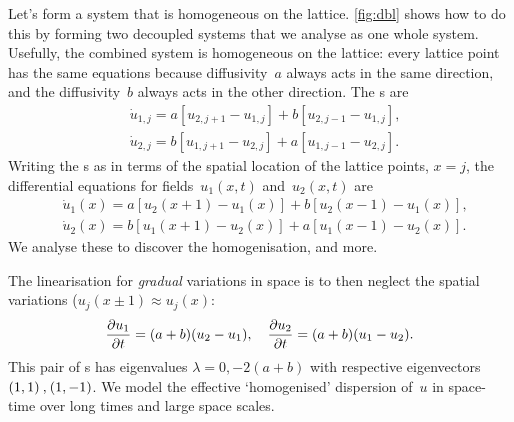 Let's form a system that is homogeneous on the lattice.
\cref{fig:dbl} shows how to do this by forming two decoupled
systems that we analyse as one whole system. Usefully, the
combined system is homogeneous on the lattice: every lattice
point has the same equations because diffusivity~\(a\)
always acts in the same direction, and the diffusivity~\(b\)
always acts in the other direction. The \ode{}s are
\begin{align*}&
\dot u_{1,j}=a[u_{2,j+1}-u_{1,j}]+b[u_{2,j-1}-u_{1,j}],
\\&
\dot u_{2,j}=b[u_{1,j+1}-u_{2,j}]+a[u_{1,j-1}-u_{2,j}].
\label{eq:}
\end{align*}
Writing the \ode{}s as in terms of the spatial location of
the lattice points, \(x=j\), the differential equations for
fields~\(u_1(x,t)\) and~\(u_2(x,t)\) are 
\begin{subequations}\label{eqssvhdmic}%
\begin{align}&
\dot u_1(x)=a[u_2(x+1)-u_1(x)] +b[u_2(x-1)-u_1(x)],
\\&
\dot u_2(x)=b[u_1(x+1)-u_2(x)] +a[u_1(x-1)-u_2(x)].
\end{align}
\end{subequations}
We analyse these to discover the homogenisation, and more.


The linearisation for \emph{gradual} variations in space is
to then neglect the spatial variations (\(u_j(x\pm1)\approx
u_j(x)\): \begin{equation*}
\D t{u_1}=(a+b)(u_2-u_1),\quad \D t{u_2}=(a+b)(u_1-u_2).
\end{equation*}
This pair of \ode{}s has eigenvalues \(\lambda=0,-2(a+b)\)
with respective eigenvectors \((1,1)\C (1,-1)\). We model
the effective `homogenised' dispersion of~\(u\) in
space-time over long times and large space scales.

